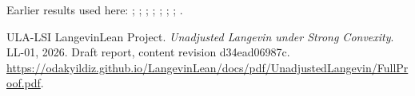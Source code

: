 \documentclass[11pt,a4paper]{article}
\begin{document}
Earlier results used here: \cite[Section~3.13.2]{LangevinLean2026ULASC}; \cite[Section~3.13.5]{LangevinLean2026ULASC}; \cite[Section~3.25.1]{LangevinLean2026ULASC}; \cite[Section~3.25.3]{LangevinLean2026ULASC}; \cite[Section~3.29.7]{LangevinLean2026ULASC}; \cite[Section~3.42.5]{LangevinLean2026ULASC}; \cite[Section~3.42.6]{LangevinLean2026ULASC}; \cite[Section~3.46.2]{LangevinLean2026ULASC}.

\begin{thebibliography}{ULA-LSI}
LangevinLean Project. \emph{Unadjusted Langevin under Strong Convexity}. LL-01, 2026. Draft report, content revision d34ead06987c. \url{https://odakyildiz.github.io/LangevinLean/docs/pdf/UnadjustedLangevin/FullProof.pdf}.
\end{thebibliography}
\end{document}
